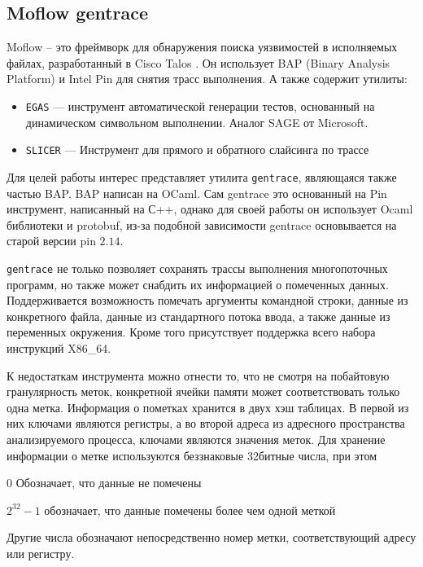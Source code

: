 \subsection{Moflow gentrace}

Moflow -- это фреймворк для обнаружения поиска уязвимостей в исполняемых файлах, разработанный в Cisco Talos \cite{moflow}. Он использует BAP (Binary Analysis Platform) и Intel Pin для снятия трасс выполнения.
А также содержит утилиты:
\begin{itemize}
    \item \texttt{EGAS} --- инструмент автоматической генерации тестов, основанный на динамическом символьном выполнении. Аналог SAGE от Microsoft.
    \item \texttt{SLICER} --- Инструмент для прямого и обратного слайсинга по трассе
\end{itemize}

Для целей работы интерес представляет утилита \texttt{gentrace}, являющаяся также частью BAP. BAP написан на OCaml. Сам gentrace это основанный на Pin инструмент, написанный на С++, однако для своей работы он использует Ocaml библиотеки и protobuf, из-за подобной зависимости gentrace основывается на старой версии pin $2.14$.

\texttt{gentrace} не только позволяет сохранять трассы выполнения многопоточных программ, но также может снабдить их информацией о помеченных данных. Поддерживается возможность помечать аргументы командной строки, данные из конкретного файла, данные из стандартного потока ввода, а также данные из переменных окружения.
Кроме того присутствует поддержка всего набора инструкций X86\_64.

К недостаткам инструмента можно отнести то, что не смотря на побайтовую гранулярность меток, конкретной ячейки памяти может соответствовать только одна метка. Информация о пометках хранится в двух хэш таблицах. В первой из них ключами являются регистры, а во второй адреса из адресного пространства анализируемого процесса, ключами являются значения меток. 
Для хранение информации о метке используются беззнаковые 32битные числа, при этом
\begin{enumarate}
    \item $0$ Обозначает, что данные не помечены
    \item $2^{32} - 1$ обозначает, что данные помечены более чем одной меткой
    \item Другие числа обозначают непосредственно номер метки, соответствующий адресу или регистру.
\end{enumarate}

